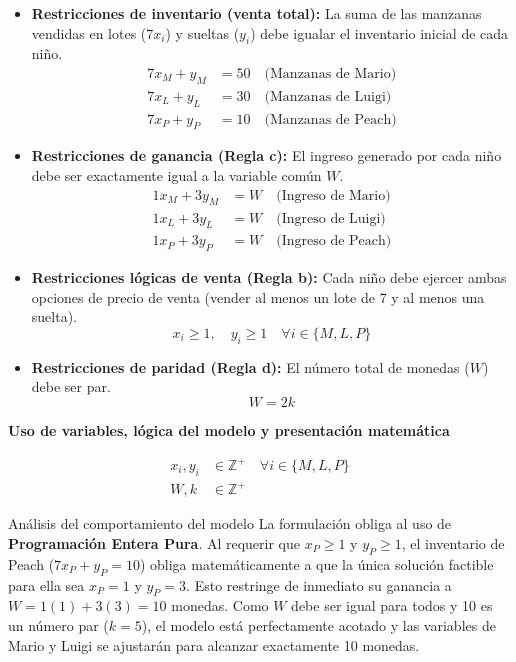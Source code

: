 \documentclass[10pt,a4paper]{article}
\begin{document}
\begin{itemize}
    \item \textbf{Restricciones de inventario (venta total):} La suma de las manzanas vendidas en lotes ($7x_i$) y sueltas ($y_i$) debe igualar el inventario inicial de cada niño.
    \begin{align*}
        7x_M + y_M &= 50 \quad \text{(Manzanas de Mario)} \\
        7x_L + y_L &= 30 \quad \text{(Manzanas de Luigi)} \\
        7x_P + y_P &= 10 \quad \text{(Manzanas de Peach)}
    \end{align*}

    \item \textbf{Restricciones de ganancia (Regla c):} El ingreso generado por cada niño debe ser exactamente igual a la variable común $W$.
    \begin{align*}
        1x_M + 3y_M &= W \quad \text{(Ingreso de Mario)} \\
        1x_L + 3y_L &= W \quad \text{(Ingreso de Luigi)} \\
        1x_P + 3y_P &= W \quad \text{(Ingreso de Peach)}
    \end{align*}

    \item \textbf{Restricciones lógicas de venta (Regla b):} Cada niño debe ejercer ambas opciones de precio de venta (vender al menos un lote de 7 y al menos una suelta).
    \[ x_i \ge 1, \quad y_i \ge 1 \quad \forall i \in \{M, L, P\} \]

    \item \textbf{Restricciones de paridad (Regla d):} El número total de monedas ($W$) debe ser par.
    \[ W = 2k \]
\end{itemize}

\vspace{3mm}

\textbf{Uso de variables, lógica del modelo y presentación matemática}

\begin{align*}
    x_i, y_i &\in \mathbb{Z}^+ \quad \forall i \in \{M, L, P\} \\
    W, k &\in \mathbb{Z}^+ 
\end{align*}

\begin{nota}{Análisis del comportamiento del modelo}
La formulación obliga al uso de \textbf{Programación Entera Pura}. Al requerir que $x_P \ge 1$ y $y_P \ge 1$, el inventario de Peach ($7x_P + y_P = 10$) obliga matemáticamente a que la única solución factible para ella sea $x_P = 1$ y $y_P = 3$. Esto restringe de inmediato su ganancia a $W = 1(1) + 3(3) = 10$ monedas. Como $W$ debe ser igual para todos y 10 es un número par ($k=5$), el modelo está perfectamente acotado y las variables de Mario y Luigi se ajustarán para alcanzar exactamente 10 monedas.
\end{nota}
\end{document}

